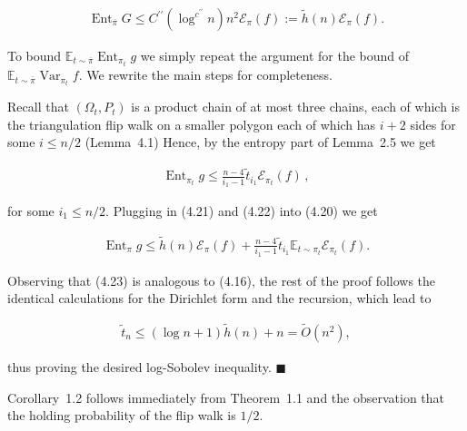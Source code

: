 \[\begin{gathered}
\operatorname{Ent}_{\overline{\pi}}G\leq C^{\prime\prime}(\log^{c^{\prime\prime}}n)n^{2}\mathcal{E}_{\pi}(f):=\tilde{h}(n)\mathcal{E}_{\pi}(f).
\end{gathered}\]


To bound $\mathbb{E}_{t\sim\overline{\pi}}\operatorname{Ent}_{\pi_{t}}g$ we simply repeat the argument for the bound of $\mathbb{E}_{t\sim\overline{\pi}}\operatorname{Var}_{\pi_{t}}f$. We rewrite the main steps for completeness.\par




Recall that $(\Omega_{t},P_{t})$ is a product chain of at most three chains, each of which is the triangulation flip walk on a smaller polygon each of which has $i+2$ sides for some $i\leq n/2$ (Lemma 4.1)
Hence, by the entropy part of Lemma 2.5 we get\par


\[\begin{gathered}
\operatorname{Ent}_{\pi_{t}}g\leq\frac{n-4}{i_{1}-1}\tilde{t}_{i_{1}}\mathcal{E}_{\pi_{t}}(f)\,,
\end{gathered}\]


for some $i_{1}\leq n/2$.
Plugging in (4.21) and (4.22) into (4.20) we get\par


\[\begin{gathered}
\operatorname{Ent}_{\pi}g\leq\tilde{h}(n)\mathcal{E}_{\pi}(f)+\frac{n-4}{i_{1}-1}\tilde{t}_{i_{1}}\mathbb{E}_{t\sim\pi_{t}}\mathcal{E}_{\pi_{t}}(f).
\end{gathered}\]


Observing that (4.23) is analogous to (4.16), the rest of the proof follows the identical calculations for the Dirichlet form and the recursion, which lead to\par


\[\begin{gathered}
\tilde{t}_{n}\leq(\log n+1)\tilde{h}(n)+n=\widetilde{O}(n^{2}),
\end{gathered}\]


thus proving the desired log-Sobolev inequality.
\ensuremath{\blacksquare}\par





Corollary 1.2 follows immediately from Theorem 1.1 and the observation that the holding probability of the flip walk is $1/2$.\par






